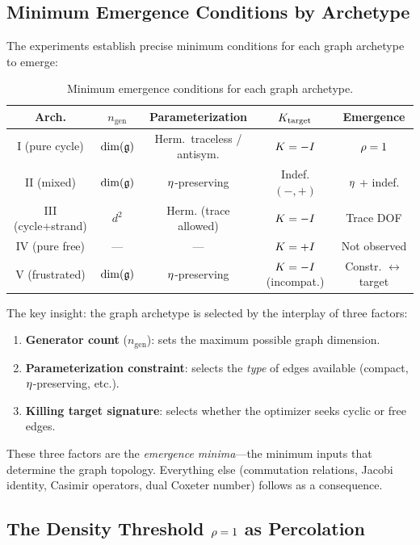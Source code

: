 \subsection{Minimum Emergence Conditions by Archetype}\label{sec:emergence_minima}

The experiments establish precise minimum conditions for each graph archetype to emerge:

\begin{table}[h]
\centering
\small
\begin{tabular}{c c c c c}
\hline\hline
Arch. & $n_{\mathrm{gen}}$ & Parameterization & $K_{\mathrm{target}}$ & Emergence \\
\hline
I (pure cycle) & $\dim(\mathfrak{g})$ & Herm.\ traceless / antisym. & $K = -I$ & $\rho = 1$ \\
II (mixed) & $\dim(\mathfrak{g})$ & $\eta$-preserving & Indef. $(-,+)$ & $\eta$ + indef. \\
III (cycle+strand) & $d^2$ & Herm. (trace allowed) & $K = -I$ & Trace DOF \\
IV (pure free) & --- & --- & $K = +I$ & Not observed \\
V (frustrated) & $\dim(\mathfrak{g})$ & $\eta$-preserving & $K = -I$ (incompat.) & Constr. $\leftrightarrow$ target \\
\hline\hline
\end{tabular}
\caption{Minimum emergence conditions for each graph archetype.}
\end{table}

The key insight: the graph archetype is selected by the interplay of three factors:

\begin{enumerate}
    \item \textbf{Generator count} ($n_{\mathrm{gen}}$): sets the maximum possible graph dimension.
    \item \textbf{Parameterization constraint}: selects the \emph{type} of edges available (compact, $\eta$-preserving, etc.).
    \item \textbf{Killing target signature}: selects whether the optimizer seeks cyclic or free edges.
\end{enumerate}

These three factors are the \emph{emergence minima}---the minimum inputs that determine the graph topology. Everything else (commutation relations, Jacobi identity, Casimir operators, dual Coxeter number) follows as a consequence.

\subsection{The Density Threshold $\rho = 1$ as Percolation}\label{sec:density_threshold}

